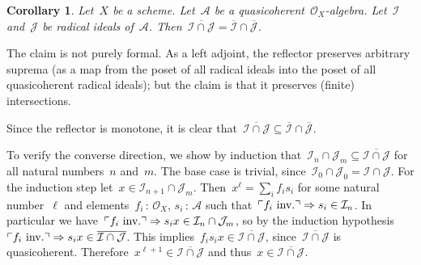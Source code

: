 \documentclass[10pt,reqno,a4paper]{amsbook}
\makeatletter
\theoremstyle{definition}
\theoremstyle{plain}
\newtheorem{cor}[defn]{Corollary}
\theoremstyle{remark}
\newcommand{\A}{\mathcal{A}}
\renewcommand{\O}{\mathcal{O}}
\newcommand{\I}{\mathcal{I}}
\newcommand{\J}{\mathcal{J}}
\newcommand{\?}{\,{:}\,}
\renewcommand{\_}{\mathpunct{.}\,}
\newcommand{\speak}[1]{\ulcorner\text{\textnormal{#1}}\urcorner}
\newcommand{\inv}{inv.\@}
\renewenvironment{proof}[1][\proofname]{\par
  \pushQED{\qed}%
  \normalfont \topsep6\p@\@plus6\p@\relax
  \trivlist
  \item[\hskip\labelsep
        \itshape
    #1\@addpunct{.}]\ignorespaces
}{%
  \popQED\endtrivlist\@endpefalse
}
\makeatother
\begin{document}
\begin{cor}\label{cor:quasicoherator-meet}
Let~$X$ be a scheme. Let~$\A$ be a quasicoherent~$\O_X$-algebra. Let~$\I$
and~$\J$ be radical ideals of~$\A$. Then~$\overline{\I \cap \J} =
\overline{\I} \cap \overline{\J}$.
\end{cor}
\begin{proof}The claim is not purely formal. As a left adjoint, the reflector
preserves arbitrary suprema (as a map from the poset of all radical ideals into the poset
of all quasicoherent radical ideals); but the claim is that it preserves (finite) intersections.

Since the reflector is monotone, it is clear that~$\overline{\I
\cap \J} \subseteq \overline{\I} \cap \overline{\J}$.

To verify the converse
direction, we show by induction that~$\I_n \cap \J_m \subseteq \overline{\I
\cap \J}$ for all natural numbers~$n$ and~$m$. The base case is trivial,
since~$\I_0 \cap \J_0 = \I \cap \J$. For the induction step let~$x \in \I_{n+1}
\cap \J_m$. Then~$x^\ell = \sum_i f_i s_i$ for some natural number~$\ell$ and
elements~$f_i \? \O_X$, $s_i \? \A$ such that~$\speak{$f_i$ \inv} \Rightarrow
s_i \in \I_n$. In particular we have~$\speak{$f_i$ \inv} \Rightarrow s_i x \in
\I_n \cap \J_m$, so by the induction hypothesis~$\speak{$f_i$ \inv} \Rightarrow
s_i x \in \overline{\I \cap \J}$. This implies~$f_i s_i x \in \overline{\I \cap
\J}$, since~$\overline{\I \cap \J}$ is quasicoherent. Therefore~$x^{\ell+1} \in
\overline{\I \cap \J}$ and thus~$x \in \overline{\I \cap \J}$.
\end{proof}
\end{document}
